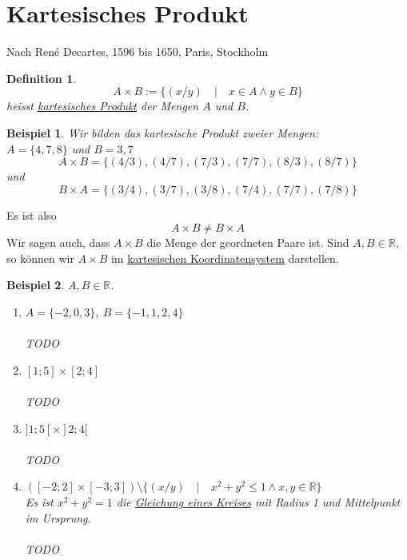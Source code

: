 \documentclass{report}
\newtheorem{mydef}{Definition}
\newtheorem{myexample}{Beispiel}
\begin{document}
\section{Kartesisches Produkt}
Nach René Decartes, 1596 bis 1650, Paris, Stockholm
\begin{mydef}\begin{equation}A \times B := \{(x/y) \quad | \quad x \in A \land y \in B\}\end{equation}heisst \underline{kartesisches Produkt} der Mengen $A$ und $B$.\end{mydef}
\begin{myexample}Wir bilden das kartesische Produkt zweier Mengen:\\
$A = \{4, 7, 8\}$ und $B = {3, 7}$
\begin{equation}A \times B = \{(4/3), (4/7), (7/3), (7/7), (8/3), (8/7)\}\end{equation}
und
\begin{equation}B \times A = \{(3/4), (3/7), (3/8), (7/4), (7/7), (7/8)\}\end{equation}
\end{myexample}Es ist also
\begin{equation}A \times B \neq B \times A\end{equation}
Wir sagen auch, dass $A \times B$ die Menge der geordneten Paare ist. Sind $A, B \in \mathbb{R}$, so können wir $A \times B$ im \underline{kartesischen Koordinatensystem} darstellen.
\begin{myexample}$A, B \in \mathbb{R}$.\begin{enumerate}\item $A = \{-2, 0, 3\}$, $B = \{-1, 1, 2, 4\}$ \\\\TODO
\item $[1;5] \times [2;4]$ \\\\TODO
\item $]1;5[ \times ]2;4[$ \\\\TODO
\item $([-2 ; 2] \times [-3 ; 3]) \setminus \{(x/y) \quad | \quad x^2 + y^2 \leq 1 \land x,y \in \mathbb{R}\}$\\
Es ist $x^2 + y^2 = 1$ die \underline{Gleichung eines Kreises} mit Radius 1 und Mittelpunkt im Ursprung.
\\\\TODO\end{enumerate}\end{myexample}
\end{document}
